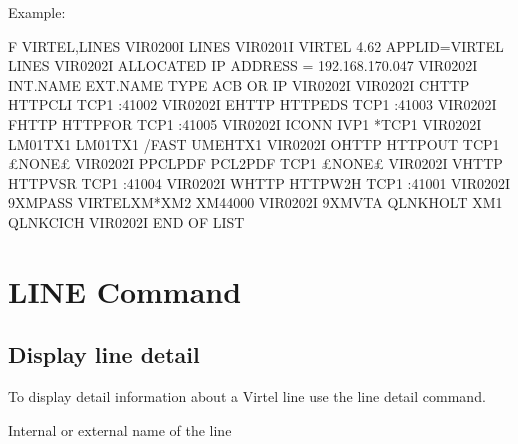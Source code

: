 \documentclass[letterpaper,10pt,english]{sphinxmanual}
\begin{document}
\sphinxAtStartPar
Example:

\begin{sphinxVerbatim}[commandchars=\\\{\}]
F VIRTEL,LINES
VIR0200I LINES
VIR0201I VIRTEL 4.62 APPLID=VIRTEL  LINES
VIR0202I ALLOCATED IP ADDRESS = 192.168.170.047
VIR0202I INT.NAME EXT.NAME TYPE  ACB OR IP
VIR0202I \PYGZhy{}\PYGZhy{}\PYGZhy{}\PYGZhy{}\PYGZhy{}\PYGZhy{}\PYGZhy{}\PYGZhy{} \PYGZhy{}\PYGZhy{}\PYGZhy{}\PYGZhy{}\PYGZhy{}\PYGZhy{}\PYGZhy{}\PYGZhy{} \PYGZhy{}\PYGZhy{}\PYGZhy{}\PYGZhy{}\PYGZhy{} \PYGZhy{}\PYGZhy{}\PYGZhy{}\PYGZhy{}\PYGZhy{}\PYGZhy{}\PYGZhy{}\PYGZhy{}\PYGZhy{}
VIR0202I C\PYGZhy{}HTTP   HTTP\PYGZhy{}CLI TCP1  :41002
VIR0202I E\PYGZhy{}HTTP   HTTP\PYGZhy{}EDS TCP1  :41003
VIR0202I F\PYGZhy{}HTTP   HTTP\PYGZhy{}FOR TCP1  :41005
VIR0202I I\PYGZhy{}CONN   IVP1    *TCP1
VIR0202I LM01TX1  LM01TX1  /FAST UMEHTX1
VIR0202I O\PYGZhy{}HTTP   HTTP\PYGZhy{}OUT TCP1  £NONE£
VIR0202I P\PYGZhy{}PCLPDF PCL2PDF  TCP1  £NONE£
VIR0202I V\PYGZhy{}HTTP   HTTP\PYGZhy{}VSR TCP1  :41004
VIR0202I W\PYGZhy{}HTTP   HTTP\PYGZhy{}W2H TCP1  :41001
VIR0202I 9\PYGZhy{}XMPASS VIRTELXM*XM2   XM44000
VIR0202I 9\PYGZhy{}XMVTA  QLNKHOLT XM1   QLNKCICH
VIR0202I \PYGZhy{}\PYGZhy{}\PYGZhy{}END OF LIST\PYGZhy{}\PYGZhy{}\PYGZhy{}
\end{sphinxVerbatim}

\ignorespaces 

\section{LINE Command}
\label{\detokenize{audit_operations_ and_performance:line-command}}\label{\detokenize{audit_operations_ and_performance:index-5}}

\subsection{Display line detail}
\label{\detokenize{audit_operations_ and_performance:display-line-detail}}
\sphinxAtStartPar
To display detail information about a Virtel line use the line detail command.

\begin{sphinxVerbatim}[commandchars=\\\{\}]
  
\end{sphinxVerbatim}
\begin{description}
\sphinxAtStartPar
Internal or external name of the line

\end{description}
\end{document}

